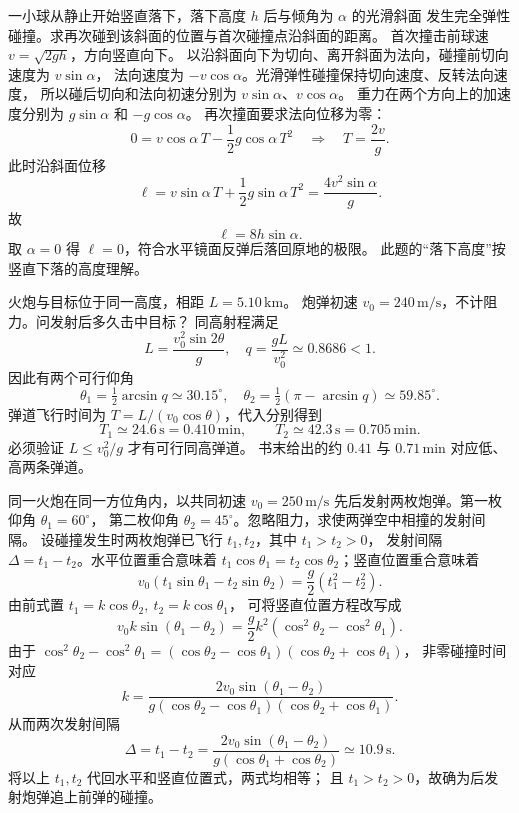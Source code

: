 
一小球从静止开始竖直落下，落下高度 $h$ 后与倾角为 $\alpha$ 的光滑斜面
发生完全弹性碰撞。求再次碰到该斜面的位置与首次碰撞点沿斜面的距离。
\exsolution
首次撞击前球速 $v=\sqrt{2gh}$，方向竖直向下。
以沿斜面向下为切向、离开斜面为法向，碰撞前切向速度为 $v\sin\alpha$，
法向速度为 $-v\cos\alpha$。光滑弹性碰撞保持切向速度、反转法向速度，
所以碰后切向和法向初速分别为 $v\sin\alpha$、$v\cos\alpha$。
重力在两个方向上的加速度分别为 $g\sin\alpha$ 和 $-g\cos\alpha$。
再次撞面要求法向位移为零：
\[
 0=v\cos\alpha\,T-\frac12g\cos\alpha\,T^2
 \quad\Longrightarrow\quad T=\frac{2v}{g}.
\]
此时沿斜面位移
\[
 \ell=v\sin\alpha\,T+\frac12g\sin\alpha\,T^2
 =\frac{4v^2\sin\alpha}{g}.
\]
故
\[
 \boxed{\ell=8h\sin\alpha.}
\]
\excheck 取 $\alpha=0$ 得 $\ell=0$，符合水平镜面反弹后落回原地的极限。
此题的“落下高度”按竖直下落的高度理解。

火炮与目标位于同一高度，相距 $L=5.10\,\mathrm{km}$。
炮弹初速 $v_0=240\,\mathrm{m/s}$，不计阻力。问发射后多久击中目标？
\exsolution
同高射程满足
\[
 L=\frac{v_0^2\sin2\theta}{g},\quad
 q=\frac{gL}{v_0^2}\simeq0.8686<1.
\]
因此有两个可行仰角
\[
 \theta_1=\tfrac12\arcsin q\simeq30.15^\circ,\quad
 \theta_2=\tfrac12(\pi-\arcsin q)\simeq59.85^\circ .
\]
弹道飞行时间为 $T=L/(v_0\cos\theta)$，代入分别得到
\[
 \boxed{T_1\simeq24.6\,\mathrm s=0.410\,\mathrm{min},\qquad
 T_2\simeq42.3\,\mathrm s=0.705\,\mathrm{min}.}
\]
\excheck 必须验证 $L\le v_0^2/g$ 才有可行同高弹道。
书末给出的约 $0.41$ 与 $0.71\,\mathrm{min}$ 对应低、高两条弹道。

同一火炮在同一方位角内，以共同初速 $v_0=250\,\mathrm{m/s}$
先后发射两枚炮弹。第一枚仰角 $\theta_1=60^\circ$，
第二枚仰角 $\theta_2=45^\circ$。忽略阻力，求使两弹空中相撞的发射间隔。
\exsolution
设碰撞发生时两枚炮弹已飞行 $t_1,t_2$，其中 $t_1>t_2>0$，
发射间隔 $\Delta=t_1-t_2$。水平位置重合意味着
$t_1\cos\theta_1=t_2\cos\theta_2$；竖直位置重合意味着
\[
 v_0(t_1\sin\theta_1-t_2\sin\theta_2)
 =\frac g2(t_1^2-t_2^2).
\]
由前式置 $t_1=k\cos\theta_2,\ t_2=k\cos\theta_1$，
可将竖直位置方程改写成
\[
 v_0k\sin(\theta_1-\theta_2)
 =\frac g2 k^2(\cos^2\theta_2-\cos^2\theta_1).
\]
由于 $\cos^2\theta_2-\cos^2\theta_1
=(\cos\theta_2-\cos\theta_1)(\cos\theta_2+\cos\theta_1)$，
非零碰撞时间对应
\[
 k=\frac{2v_0\sin(\theta_1-\theta_2)}
 {g(\cos\theta_2-\cos\theta_1)(\cos\theta_2+\cos\theta_1)}.
\]
从而两次发射间隔
\[
 \boxed{\Delta=t_1-t_2=
 \frac{2v_0\sin(\theta_1-\theta_2)}
 {g(\cos\theta_1+\cos\theta_2)}\simeq10.9\,\mathrm s.}
\]
\excheck 将以上 $t_1,t_2$ 代回水平和竖直位置式，两式均相等；
且 $t_1>t_2>0$，故确为后发射炮弹追上前弹的碰撞。


